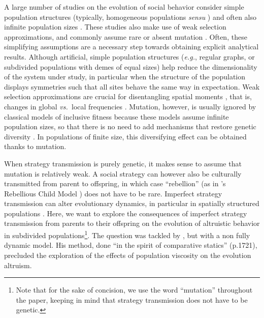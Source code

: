 \documentclass[11pt, letterpaper]{article}
\newcommand{\eg}{\textit{e.g.}}
\newcommand{\vs}{\textit{vs.\ }}
\begin{document}
A large number of studies on the evolution of social behavior consider simple population structures (typically, homogeneous populations \textit{sensu} \citet[][]{TaylorDayWild2007}) and often also infinite population sizes \citep[but see][for results on any structure]{Allen2017}. 
These studies also make use of weak selection approximations, and commonly assume rare \citep[\eg,][]{LeturqueRousset2002, Taylor2007JTB, TarnitaTaylor2014} or absent mutation \citep[for models assuming infinite population sizes, or models concentrating on fixation probabilities; see][for recent reviews]{LehmannRousset2014,VanCleve2015}. 
Often, these simplifying assumptions are a necessary step towards obtaining explicit analytical results. 
Although artificial, simple population structures (\eg, regular graphs, or subdivided populations with demes of equal sizes) help reduce the dimensionality of the system under study, in particular when the structure of the population displays symmetries such that all sites behave the same way in expectation. 
Weak selection approximations are crucial for disentangling spatial moments \citep{Lion2016}, that is, changes in global \vs local frequencies \citep[though they can in some cases be relaxed, as in][]{MullonLehmann2014}. 
Mutation, however, is usually ignored by classical models of inclusive fitness because these models assume infinite population sizes, so that there is no need to add mechanisms that restore genetic diversity \citep{TarnitaTaylor2014}. In populations of finite size,  this diversifying effect can be obtained thanks to mutation. %

When strategy transmission is purely genetic, it makes sense to assume that mutation is relatively weak. A social strategy can however also be culturally transmitted from parent to offspring, in which case ``rebellion'' (as in \citeauthor{Frank1997}'s Rebellious Child Model \citep{Frank1997}) does not have to be rare. Imperfect strategy transmission can alter evolutionary dynamics, in particular in spatially structured populations \citep[see \eg,][for graph-structured populations]{Allen2012,Debarre2017}. Here, we want to explore the consequences of imperfect strategy transmission from parents to their offspring on the evolution of altruistic behavior in subdivided populations\footnote{Note that for the sake of concision, we use the word ``mutation'' throughout the paper, keeping in mind that strategy transmission does not have to be genetic. }. The question was tackled by \citet{Frank1997}, but with a non fully dynamic model. His method, done ``in the spirit of comparative statics'' (p.1721), precluded the exploration of the effects of population viscosity on the evolution altruism. 
\end{document}
